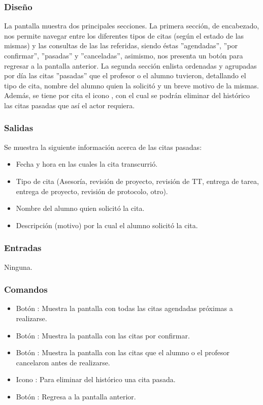 \subsubsection{Diseño}
	\noindent
	La pantalla muestra dos principales secciones. La primera sección, de encabezado, nos permite navegar entre los diferentes tipos de citas (según el estado de las mismas) y las consultas de las las referidas, siendo éstas ''agendadas'', ''por confirmar'', ''pasadas'' y ''canceladas'', asimismo, nos presenta un botón para regresar a la pantalla anterior.
	\newline
	La segunda sección enlista ordenadas y agrupadas por día las citas ''pasadas'' que el profesor o el alumno tuvieron, detallando el tipo de cita, nombre del alumno quien la solicitó y un breve motivo de la mismas. Además, se tiene por cita el icono , con el cual se podrán eliminar del histórico las citas pasadas que así el actor requiera.

\pagebreak
{}

\subsubsection{Salidas}
	\noindent
	Se muestra la siguiente información acerca de las citas pasadas:
		\begin{itemize}
			\item Fecha y hora en las cuales la cita transcurrió.
			\item Tipo de cita (Asesoría, revisión de proyecto, revisión de TT, entrega de tarea, entrega de proyecto, revisión de protocolo, otro).
			\item Nombre del alumno quien solicitó la cita.
			\item Descripción (motivo) por la cual el alumno solicitó la cita.
		\end{itemize}

\subsubsection{Entradas}
	\noindent
	Ninguna.

\subsubsection{Comandos}
	\begin{itemize}
		\item Botón : Muestra la pantalla con todas las citas agendadas próximas a realizarse.
		\item Botón : Muestra la pantalla con las citas por confirmar.
		\item Botón : Muestra la pantalla con las citas que el alumno o el profesor cancelaron antes de realizarse.
		\item Icono : Para eliminar del histórico una cita pasada.
		\item Botón : Regresa a la pantalla anterior.
	\end{itemize}

